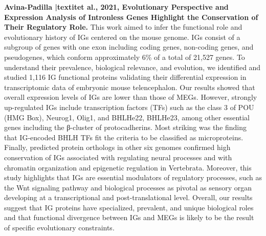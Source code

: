 \documentclass[11pt]{article}
\begin{document}
\begin{sloppypar}
\textbf{Avina-Padilla |textit{et al.}, 2021, Evolutionary Perspective and Expression Analysis of Intronless Genes Highlight the Conservation of Their Regulatory Role.} \newline
This work aimed to infer the functional role and evolutionary history of IGs centered on the mouse genome. IGs consist of a subgroup of genes with one exon including coding genes, non-coding genes, and pseudogenes, which conform approximately 6\% of a total of 21,527 genes. To understand their prevalence, biological relevance, and evolution, we identified and studied 1,116 IG functional proteins validating their differential expression in transcriptomic data of embryonic mouse telencephalon. Our results showed that overall expression levels of IGs are lower than those of MEGs. However, strongly up-regulated IGs include transcription factors (TFs) such as the class 3 of POU (HMG Box), Neurog1, Olig1, and BHLHe22, BHLHe23, among other essential genes including the β-cluster of protocadherins. Most striking was the finding that IG-encoded BHLH TFs fit the criteria to be classified as microproteins. Finally, predicted protein orthologs in other six genomes confirmed high conservation of IGs associated with regulating neural processes and with chromatin organization and epigenetic regulation in Vertebrata. Moreover, this study highlights that IGs are essential modulators of regulatory processes, such as the Wnt signaling pathway and biological processes as pivotal as sensory organ developing at a transcriptional and post-translational level. Overall, our results suggest that IG proteins have specialized, prevalent, and unique biological roles and that functional divergence between IGs and MEGs is likely to be the result of specific evolutionary constraints.
\par


\end{sloppypar}
\end{document}
